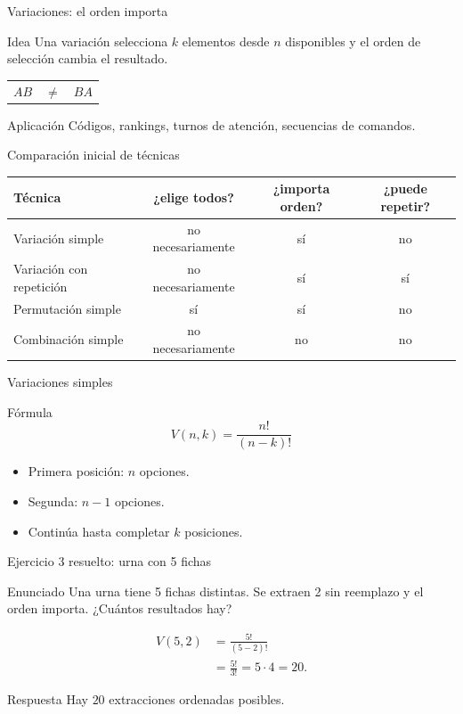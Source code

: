 \documentclass[aspectratio=169,11pt]{beamer}
\begin{document}
\begin{frame}{Variaciones: el orden importa}
\begin{block}{Idea}
Una variación selecciona $k$ elementos desde $n$ disponibles y el orden de selección cambia el resultado.
\end{block}
\begin{center}
\begin{tabular}{ccc}
$AB$ & $\neq$ & $BA$ \\
\end{tabular}
\end{center}
\begin{exampleblock}{Aplicación}
Códigos, rankings, turnos de atención, secuencias de comandos.
\end{exampleblock}
\end{frame}

\begin{frame}{Comparación inicial de técnicas}
\small
\begin{center}
\begin{tabular}{p{}ccc}
\toprule
Técnica & ¿elige todos? & ¿importa orden? & ¿puede repetir? \\
\midrule
Variación simple & no necesariamente & sí & no \\
Variación con repetición & no necesariamente & sí & sí \\
Permutación simple & sí & sí & no \\
Combinación simple & no necesariamente & no & no \\
\bottomrule
\end{tabular}
\end{center}
\end{frame}

\begin{frame}{Variaciones simples}
\begin{block}{Fórmula}
\[
V(n,k)=\frac{n!}{(n-k)!}
\]
\end{block}
\begin{itemize}
  \item Primera posición: $n$ opciones.
  \item Segunda: $n-1$ opciones.
  \item Continúa hasta completar $k$ posiciones.
\end{itemize}
\end{frame}

\begin{frame}{Ejercicio 3 resuelto: urna con 5 fichas}
\begin{block}{Enunciado}
Una urna tiene 5 fichas distintas. Se extraen 2 sin reemplazo y el orden importa. ¿Cuántos resultados hay?
\end{block}
\pause
\begin{align*}
V(5,2)&=\frac{5!}{(5-2)!}\\
&=\frac{5!}{3!}=5\cdot4=20.
\end{align*}
\begin{exampleblock}{Respuesta}
Hay $20$ extracciones ordenadas posibles.
\end{exampleblock}
\end{frame}
\end{document}
